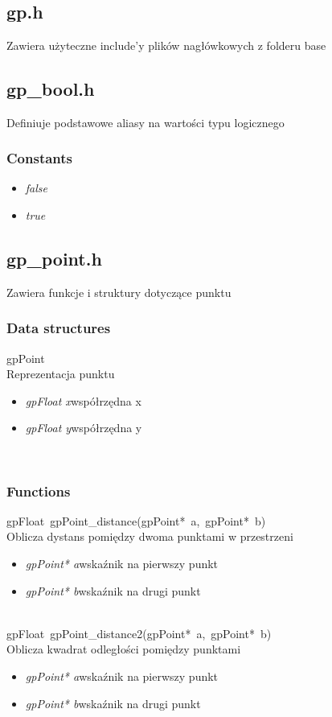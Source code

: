  \ \\

\subsection{gp.h}
Zawiera użyteczne include'y plików nagłówkowych z folderu base
\subsection{gp_bool.h}
Definiuje podstawowe aliasy na wartości typu logicznego
\subsubsection{Constants}
\begin{itemize}
\item \textit{false}\qquad
\item \textit{true}\qquad
\end{itemize}

\subsection{gp_point.h}
Zawiera funkcje i struktury dotyczące punktu
\subsubsection{Data structures}
\textsf{gpPoint} \\ \indent Reprezentacja punktu
	\begin{itemize}
		\item \textit{gpFloat x}\quad współrzędna x
		\item \textit{gpFloat y}\quad współrzędna y
	\end{itemize}
\ \\
\subsubsection{Functions}
\mbox{\textsf{gpFloat gpPoint_distance(gpPoint* a, gpPoint* b)}} \\ \indent Oblicza dystans pomiędzy dwoma punktami w przestrzeni
	\begin{itemize}
		\item \textit{gpPoint* a}\quad wskaźnik na pierwszy punkt
		\item \textit{gpPoint* b}\quad wskaźnik na drugi punkt
	\end{itemize}

 \ \\
\mbox{\textsf{gpFloat gpPoint_distance2(gpPoint* a, gpPoint* b)}} \\ \indent Oblicza kwadrat odległości pomiędzy punktami
	\begin{itemize}
		\item \textit{gpPoint* a}\quad wskaźnik na pierwszy punkt
		\item \textit{gpPoint* b}\quad wskaźnik na drugi punkt
	\end{itemize}

